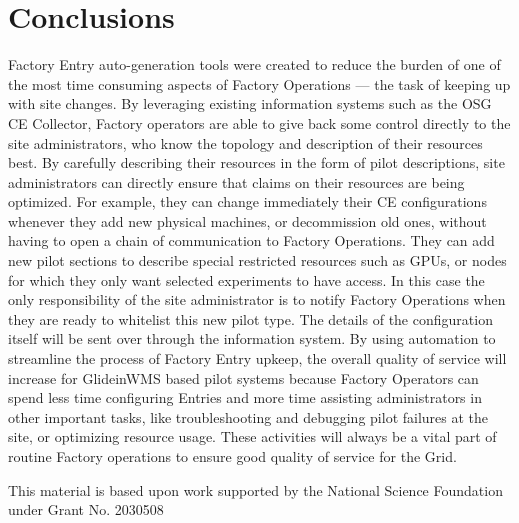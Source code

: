 \documentclass[manuscript,screen,review]{acmart}
\begin{document}
\section{Conclusions}
\label{conclusions}
Factory Entry auto-generation tools were created to reduce the burden of one of the most time consuming aspects of Factory Operations --- the task of keeping up with site changes. By leveraging existing information systems such as the OSG CE Collector, Factory operators are able to give back some control directly to the site administrators, who know the topology and description of their resources best. By carefully describing their resources in the form of pilot descriptions, site administrators can directly ensure that claims on their resources are being optimized. For example, they can change immediately their CE configurations whenever they add new physical machines, or decommission old ones, without having to open a chain of communication to Factory Operations. They can add new pilot sections to describe special restricted resources such as GPUs, or nodes for which they only want selected experiments to have access. In this case the only responsibility of the site administrator is to notify Factory Operations when they are ready to whitelist this new pilot type. The details of the configuration itself will be sent over through the information system. By using automation to streamline the process of Factory Entry upkeep, the overall quality of service will increase for GlideinWMS based pilot systems because Factory Operators can spend less time configuring Entries and more time assisting administrators in other important tasks, like troubleshooting and debugging pilot failures at the site, or optimizing resource usage. These activities will always be a vital part of routine Factory operations to ensure good quality of service for the Grid.

\begin{acks}
This material is based upon work supported by the National Science Foundation under Grant
No. 2030508
\end{acks}



\end{document}
